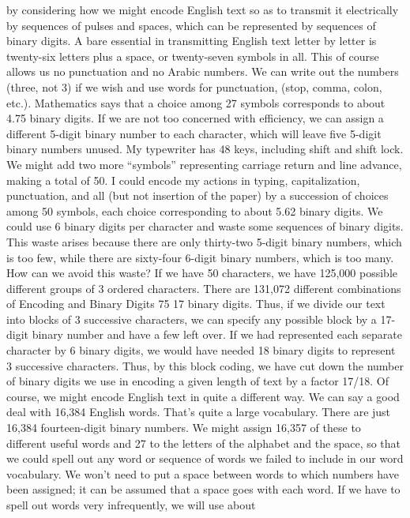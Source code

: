 by considering how we might encode English text so as to transmit
it electrically by sequences of pulses and spaces, which can be
represented by sequences of binary digits.
A bare essential in transmitting English text letter by letter is
twenty-six letters plus a space, or twenty-seven symbols in all. This
of course allows us no punctuation and no Arabic numbers.
We can write out the numbers (three, not 3) if we wish and use
words for punctuation, (stop, comma, colon, etc.).
Mathematics says that a choice among 27 symbols corresponds
to about 4.75 binary digits. If we are not too concerned with
efficiency, we can assign a different 5-digit binary number to each
character, which will leave five 5-digit binary numbers unused.
My typewriter has 48 keys, including shift and shift lock. We
might add two more “symbols” representing carriage return and
line advance, making a total of 50. I could encode my actions in
typing, capitalization, punctuation, and all (but not insertion of the
paper) by a succession of choices among 50 symbols, each choice
corresponding to about 5.62 binary digits. We could use 6 binary
digits per character and waste some sequences of binary digits.
This waste arises because there are only thirty-two 5-digit binary
numbers, which is too few, while there are sixty-four 6-digit binary
numbers, which is too many. How can we avoid this waste? If we
have 50 characters, we have 125,000 possible different groups of 3
ordered characters. There are 131,072 different combinations of
Encoding and Binary Digits
75
17 binary digits. Thus, if we divide our text into blocks of 3 successive
characters, we can specify any possible block by a 17-digit
binary number and have a few left over. If we had represented each
separate character by 6 binary digits, we would have needed 18
binary digits to represent 3 successive characters. Thus, by this
block coding, we have cut down the number of binary digits we use
in encoding a given length of text by a factor 17/18.
Of course, we might encode English text in quite a different way.
We can say a good deal with 16,384 English words. That’s quite a
large vocabulary. There are just 16,384 fourteen-digit binary numbers.
We might assign 16,357 of these to different useful words and
27 to the letters of the alphabet and the space, so that we could
spell out any word or sequence of words we failed to include in
our word vocabulary. We won’t need to put a space between words
to which numbers have been assigned; it can be assumed that a
space goes with each word.
If we have to spell out words very infrequently, we will use about
